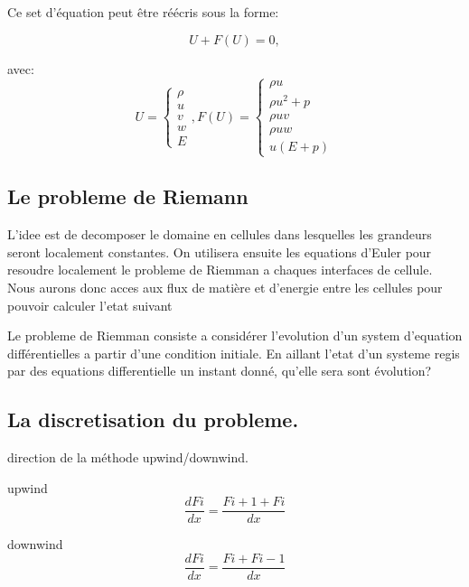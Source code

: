 Ce set d'équation peut être réécris sous la forme:

\begin{equation}
U+F(U) = 0,
\end{equation}

avec:
\begin{equation}
U=
\begin{cases}
{ \rho}\\
{ u}\\
{ v}\\
{ w}\\
{ E}
\end{cases}
,
F(U)=
\begin{cases}
{ \rho u}\\
{ \rho u^2+p}\\
{ \rho uv}\\
{ \rho uw}\\
{ u(E+p)}
\end{cases}
\end{equation}


\subsection{Le probleme de Riemann}
L'idee est de decomposer le domaine en cellules dans lesquelles les grandeurs seront localement constantes.
On utilisera ensuite les equations d'Euler pour resoudre localement le probleme de Riemman a chaques interfaces de cellule.
Nous aurons donc acces aux flux de matière et d'energie entre les cellules pour pouvoir calculer l'etat suivant  


Le probleme de Riemman consiste a considérer l'evolution d'un system d'equation différentielles a partir d'une condition initiale.
En aillant l'etat d'un systeme regis par des equations differentielle un instant donné, qu'elle sera sont évolution?

\subsection{La discretisation du probleme.}


direction de la méthode upwind/downwind.

upwind
\begin{equation}
\frac{d Fi}{dx} = \frac{Fi+1  + Fi}{dx} 
\end{equation}

downwind
\begin{equation}
\frac{d Fi}{dx} = \frac{Fi  + Fi-1}{dx} 
\end{equation}


